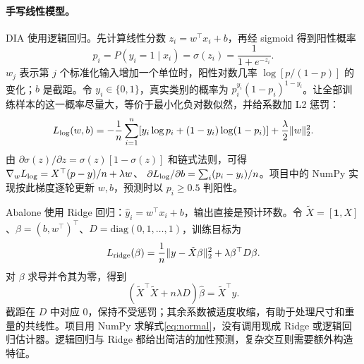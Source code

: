 \documentclass[UTF8,a4paper,11pt]{ctexart}
\begin{document}
\paragraph{手写线性模型。}DIA 使用逻辑回归。先计算线性分数 $z_i=w^\top x_i+b$，再经 sigmoid 得到阳性概率
\begin{equation}
p_i=P(y_i=1\mid x_i)=\sigma(z_i)=\frac{1}{1+e^{-z_i}}.
\label{eq:logistic}
\end{equation}
$w_j$ 表示第 $j$ 个标准化输入增加一个单位时，阳性对数几率 $\log[p/(1-p)]$ 的变化；$b$ 是截距。令 $y_i\in\{0,1\}$，真实类别的概率为 $p_i^{y_i}(1-p_i)^{1-y_i}$。让全部训练样本的这一概率尽量大，等价于最小化负对数似然，并给系数加 L2 惩罚：
\begin{equation}
L_{\rm log}(w,b)=-\frac1n\sum_{i=1}^n[y_i\log p_i+(1-y_i)\log(1-p_i)]
                     +\frac{\lambda}{2}\|w\|_2^2.
\label{eq:logloss}
\end{equation}
由 $\partial\sigma(z)/\partial z=\sigma(z)[1-\sigma(z)]$ 和链式法则，可得
$\nabla_wL_{\rm log}=X^\top(p-y)/n+\lambda w$、
$\partial L_{\rm log}/\partial b=\sum_i(p_i-y_i)/n$。项目中的 NumPy 实现按此梯度逐轮更新 $w,b$，预测时以 $p_i\ge0.5$ 判阳性。

Abalone 使用 Ridge 回归：$\hat y_i=w^\top x_i+b$，输出直接是预计环数。令 $\tilde X=[\mathbf1,X]$、$\beta=(b,w^\top)^\top$、$D=\mathrm{diag}(0,1,\ldots,1)$，训练目标为
\begin{equation}
L_{\rm ridge}(\beta)=\frac1n\|y-\tilde X\beta\|_2^2+\lambda\beta^\top D\beta.
\label{eq:ridge}
\end{equation}
对 $\beta$ 求导并令其为零，得到
\begin{equation}
(\tilde X^\top\tilde X+n\lambda D)\hat\beta=\tilde X^\top y.
\label{eq:normal}
\end{equation}
截距在 $D$ 中对应 0，保持不受惩罚；其余系数被适度收缩，有助于处理尺寸和重量的共线性。项目用 NumPy 求解式\eqref{eq:normal}，没有调用现成 Ridge 或逻辑回归估计器。逻辑回归与 Ridge 都给出简洁的加性预测，复杂交互则需要额外构造特征。
\end{document}
